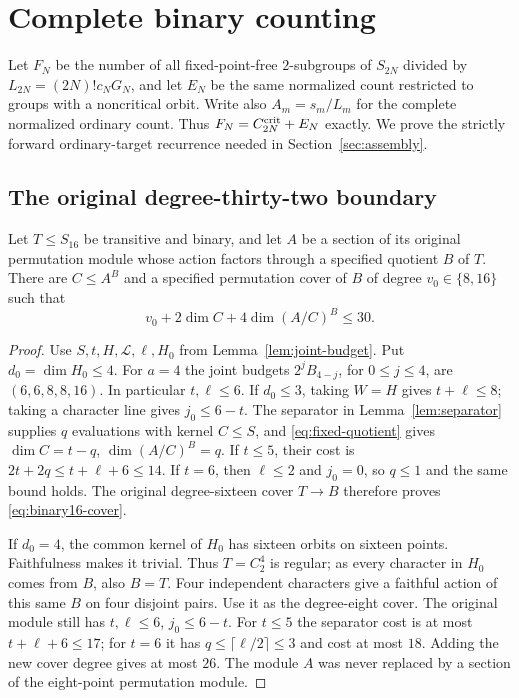 \section{Complete binary counting}
\label{sec:binary-complete}
Let $F_N$ be the number of all fixed-point-free $2$-subgroups of
$S_{2N}$ divided by $L_{2N}=(2N)!c_NG_N$, and let $E_N$ be the
same normalized count restricted to groups with a noncritical orbit.
Write also $A_m=s_m/L_m$ for the complete normalized ordinary count.
Thus $F_N=C_{2N}^{\mathrm{crit}}+E_N$ exactly. We prove the strictly forward
ordinary-target recurrence needed in Section~\ref{sec:assembly}.

\subsection{The original degree-thirty-two boundary}
\begin{theorem}\label{thm:binary16-cover}
Let $T\leq S_{16}$ be transitive and binary, and let $A$ be a section
of its original permutation module whose action factors through a
specified quotient $B$ of $T$. There are $C\leq A^B$ and a specified
permutation cover of $B$ of degree $v_0\in\{8,16\}$ such that
\begin{equation}\label{eq:binary16-cover}
 v_0+2\dim C+4\dim(A/C)^B\leq30.
\end{equation}
\end{theorem}
\begin{proof}
Use $S,t,H,\mathcal L,\ell,H_0$ from
Lemma~\ref{lem:joint-budget}. Put $d_0=\dim H_0\leq4$.
For $a=4$ the joint budgets $2^jB_{4-j}$, for $0\leq j\leq4$,
are $(6,6,8,8,16)$. In particular $t,\ell\leq6$.
If $d_0\leq3$, taking $W=H$ gives $t+\ell\leq8$; taking a
character line gives $j_0\leq6-t$. The separator in
Lemma~\ref{lem:separator} supplies $q$ evaluations with kernel
$C\leq S$, and \eqref{eq:fixed-quotient} gives
$\dim C=t-q$, $\dim(A/C)^B=q$.
If $t\leq5$, their cost is
$2t+2q\leq t+\ell+6\leq14$.
If $t=6$, then $\ell\leq2$ and $j_0=0$, so $q\leq1$ and the
same bound holds. The original degree-sixteen cover $T\to B$
therefore proves \eqref{eq:binary16-cover}.

If $d_0=4$, the common kernel of $H_0$ has sixteen orbits on sixteen
points. Faithfulness makes it trivial. Thus $T=C_2^4$ is regular;
as every character in $H_0$ comes from $B$, also $B=T$.
Four independent characters give a faithful action of this same $B$
on four disjoint pairs. Use it as the degree-eight cover.
The original module still has $t,\ell\leq6$, $j_0\leq6-t$.
For $t\leq5$ the separator cost is at most $t+\ell+6\leq17$;
for $t=6$ it has $q\leq\lceil\ell/2\rceil\leq3$ and cost at most
$18$. Adding the new cover degree gives at most $26$.
The module $A$ was never replaced by a section of the eight-point
permutation module.
\end{proof}

